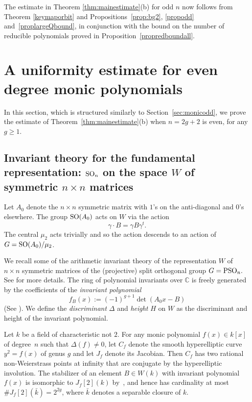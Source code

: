 \documentclass[11pt]{article}
\def\SO{{\rm SO}}
\def\PSO{{\rm PSO}}
\def\C{{\mathcal C}}
\def\C{{\mathbb C}}
\begin{document}
The estimate in Theorem \ref{thm:mainestimate}(b) for odd $n$ now
follows from Theorem \ref{keymaporbit} and
Propositions~\ref{prop:bg2}, \ref{propodd} and~\ref{proplargeQbound},
in conjunction with the bound on the number of reducible polynomials
proved in Proposition~\ref{propredboundall}.





\section{A uniformity estimate for even degree monic polynomials}\label{sec:moniceven}

In this section, which is structured similarly to Section~\ref{sec:monicodd}, we
prove the estimate of Theorem~\ref{thm:mainestimate}(b) when $n=2g+2$
is even, for any $g\geq 1$.

\subsection{Invariant theory for the fundamental representation: $\SO_n$ on the space $W$ of symmetric $n\times n$ matrices}



Let $A_0$ denote the $n\times n$ symmetric matrix with $1$'s on the
anti-diagonal and $0$'s elsewhere. The group $\SO(A_0)$ acts on $W$
via the action
\begin{equation*}
\gamma\cdot B=\gamma B\gamma^t.
\end{equation*}
The central $\mu_2$ acts trivially and so the action descends to an
action of $G=\SO(A_0)/\mu_2$.

We recall some of the arithmetic invariant theory of the
representation $W$ of $n\times n$ symmetric matrices of the
(projective) split orthogonal group $G=\PSO_n.$ See \cite{SW} for more
details. The ring of polynomial invariants over $\C$ is
freely generated by the coefficients of the {\it invariant
  polynomial} $$f_B(x):=(-1)^{g+1}\det(A_0x-B)$$ (See \cite[\S2.1, 2.2]{SW}). We define the {\it
  discriminant} $\Delta$ and {\it height} $H$ on $W$ as the discriminant
and height of the invariant polynomial.

Let $k$ be a field of characteristic not $2$.
For any monic polynomial $f(x)\in k[x]$ of degree~$n$ such
that $\Delta(f)\neq0$, let $C_f$ denote the smooth hyperelliptic curve
$y^2=f(x)$ of genus $g$ and let $J_f$ denote its Jacobian. Then $C_f$
has two rational non-Weierstrass points at infinity that are conjugate
by the hyperelliptic involution.
The stabilizer of an element $B\in W(k)$ with invariant polynomial $f(x)$
is isomorphic to $J_f[2](k)$ by~\cite[Proposition~2.33]{W}, and hence has cardinality at most $\#J_f[2](\bar k)=2^{2g}$, where $\bar k$ denotes a separable closure of $k$.
\end{document}
